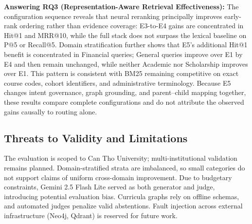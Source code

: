 \textbf{Answering RQ3 (Representation-Aware Retrieval Effectiveness):} The configuration sequence reveals that neural reranking principally improves early-rank ordering rather than evidence coverage: E3-to-E4 gains are concentrated in Hit@1 and MRR@10, while the full stack does not surpass the lexical baseline on P@5 or Recall@5. Domain stratification further shows that E5's additional Hit@1 benefit is concentrated in Financial queries; General queries improve over E1 by E4 and then remain unchanged, while neither Academic nor Scholarship improves over E1. This pattern is consistent with BM25 remaining competitive on exact course codes, cohort identifiers, and administrative terminology. Because E5 changes intent governance, graph grounding, and parent--child mapping together, these results compare complete configurations and do not attribute the observed gains causally to routing alone.

\subsection{Threats to Validity and Limitations}
\label{sec:limitations}

The evaluation is scoped to Can Tho University; multi-institutional validation remains planned. Domain-stratified strata are imbalanced, so small categories do not support claims of uniform cross-domain improvement. Due to budgetary constraints, Gemini 2.5 Flash Lite served as both generator and judge, introducing potential evaluation bias. Curricula graphs rely on offline schemas, and automated judges penalize valid abstentions. Fault injection across external infrastructure (Neo4j, Qdrant) is reserved for future work.
